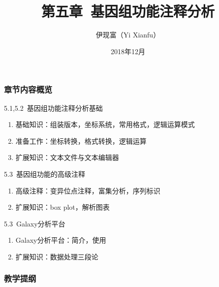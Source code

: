 




\title[基因组功能注释分析]{第五章\ 基因组功能注释分析}
\author[Yixf]{伊现富（Yi Xianfu）}
\date{2018年12月}

\begin{frame}
  \titlepage
\end{frame}

\begin{frame}
  \frametitle{章节内容概览}
  \begin{block}{5.1,5.2\ 基因组功能注释分析基础}
    \begin{enumerate}
      \item 基础知识：组装版本，坐标系统，常用格式，逻辑运算模式
      \item 准备工作：坐标转换，格式转换，逻辑运算
      \item 扩展知识：文本文件与文本编辑器
    \end{enumerate}
  \end{block}
  \begin{block}{5.3\ 基因组功能的高级注释}
    \begin{enumerate}
      \item 高级注释：变异位点注释，富集分析，序列标识
      \item 扩展知识：box plot，解析图表
    \end{enumerate}
  \end{block}
  \begin{block}{5.3\ Galaxy分析平台}
    \begin{enumerate}
      \item Galaxy分析平台：简介，使用
      \item 扩展知识：数据处理三段论
    \end{enumerate}
  \end{block}
\end{frame}

\begin{frame}[plain]
  \frametitle{教学提纲}
  \setcounter{tocdepth}{2}
  \begin{multicols}{2}
  \tableofcontents
  \end{multicols}
\end{frame}








